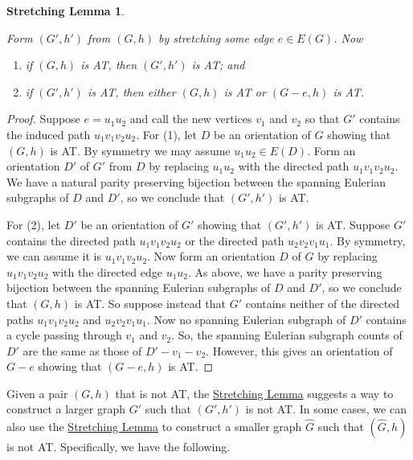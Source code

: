 \documentclass[12pt]{article}
\theoremstyle{plain}
\newtheorem*{stretching}{Stretching Lemma}
\theoremstyle{definition}
\theoremstyle{remark}
\begin{document}
	\begin{stretching}\hypertarget{target:SubdivideTwice}{}
		Form $(G',h')$ from $(G,h)$ by stretching some edge $e\in E(G)$.
		Now
		\begin{enumerate}
			\item[(1)] if $(G,h)$ is AT, then $(G', h')$ is AT; and
			\item[(2)] if $(G', h')$ is AT, then either $(G,h)$ is AT or $(G-e,h)$ is AT.
		\end{enumerate}	
	\end{stretching}
	\begin{proof}
		Suppose $e = u_1u_2$ and call the new vertices $v_1$ and $v_2$ so that $G'$ contains
		the induced path $u_1v_1v_2u_2$.  For (1), let $D$ be an orientation of $G$ showing
		that $(G,h)$ is AT. By symmetry we may assume $u_1u_2 \in E(D)$. Form an
		orientation $D'$ of $G'$ from $D$ by replacing $u_1u_2$ with the directed path
		$u_1v_1v_2u_2$.  We have a natural parity preserving bijection between the spanning
		Eulerian subgraphs of $D$ and $D'$, so we conclude that $(G', h')$ is AT.
		
		For (2), let $D'$ be an orientation of $G'$ showing that $(G',h')$ is AT. 
		Suppose $G'$ contains the directed path $u_1v_1v_2u_2$ or the directed path
		$u_2v_2v_1u_1$.  By symmetry, we can assume it is $u_1v_1v_2u_2$.  Now form an
		orientation $D$ of $G$ by replacing $u_1v_1v_2u_2$ with the directed edge
		$u_1u_2$.  As above, we have a parity preserving bijection between the spanning
		Eulerian subgraphs of $D$ and $D'$, so we conclude that $(G, h)$ is AT.  So
		suppose instead that $G'$ contains neither of the directed paths $u_1v_1v_2u_2$
		and $u_2v_2v_1u_1$.  Now no spanning Eulerian subgraph of $D'$ contains a cycle
		passing through $v_1$ and $v_2$.  So, the spanning Eulerian subgraph counts of
		$D'$ are the same as those of $D' - v_1 - v_2$.  However, this gives an
		orientation of $G-e$ showing that $(G-e, h)$ is AT.  
	\end{proof}
	
	Given a pair $(G,h)$ that is not AT, the \hyperlink{target:SubdivideTwice}{Stretching Lemma} suggests a way to construct a larger graph $G'$ such that $(G',h')$ is
	not AT.  In some cases, we can also use the
	\hyperlink{target:SubdivideTwice}{Stretching Lemma} to construct a smaller graph
	$\widehat{G}$ such that $(\widehat{G},h)$ is not AT.  
	Specifically, we have the following.
	
\end{document}
